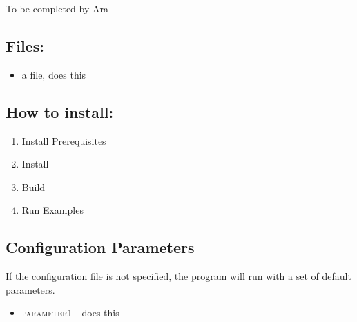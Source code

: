 To be completed by Ara

\subsection{Files:}

\begin{itemize}
\item{a file, does this}
\end{itemize}


\subsection{How to install:}
\begin{enumerate}
	\item{Install Prerequisites} 
	\item{Install } 
	\item{Build } 
	\item{Run Examples} 
\end{enumerate}

\subsection{Configuration Parameters}
If the configuration file is not specified, the program will run with a set of default parameters.
\begin{itemize}
	\item{\textsc{parameter1 }} - does this

\end{itemize}



